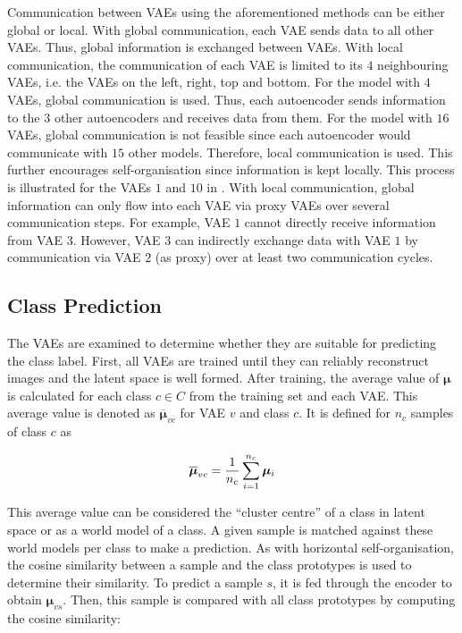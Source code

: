 Communication between VAEs using the aforementioned methods can be either global or local.
With global communication, each VAE sends data to all other VAEs. Thus, global information is exchanged between VAEs.
With local communication, the communication of each VAE is limited to its  $4$ neighbouring VAEs, i.e. the VAEs on the left, right, top and bottom.
For the model with $4$ VAEs, global communication is used. Thus, each autoencoder sends information to the $3$ other autoencoders and receives data from them.
For the model with $16$ VAEs, global communication is not feasible since each autoencoder would communicate with $15$ other models. Therefore, local communication is used.
This further encourages self-organisation since information is kept locally.
This process is illustrated for the VAEs $1$ and $10$ in . 
With local communication, global information can only flow into each VAE via proxy VAEs over several communication steps. For example, VAE $1$ cannot directly receive information from VAE $3$. However, VAE $3$ can indirectly exchange data with VAE $1$ by communication via VAE $2$ (as proxy) over at least two communication cycles.


\subsection{Class Prediction}
The VAEs are examined to determine whether they are suitable for predicting the class label. First, all VAEs are trained until they can reliably reconstruct images and the latent space is well formed.
After training, the average value of $\boldsymbol{\mu}$ is calculated for each class $c \in C$ from the training set and each VAE. This average value is denoted as $\boldsymbol{\overline{\mu}}_{vc}$ for VAE $v$ and class $c$. It is defined for $n_c$ samples of class $c$ as

\begin{align}\eqlbl{hso_12}
		\boldsymbol{\overline{\mu}}_{vc} = \frac{1}{n_c} \sum_{i=1}^{n_c} \boldsymbol{\mu}_i
\end{align}

This average value can be considered the ``cluster centre'' of a class in latent space or as a world model of a class. A given sample is matched against these world models per class to make a prediction. As with horizontal self-organisation, the cosine similarity between a sample and the class prototypes is used to determine their similarity. To predict a sample $s$, it is fed through the encoder to obtain $\boldsymbol{\mu}_{vs}$. Then, this sample is compared with all class prototypes by computing the cosine similarity: 

